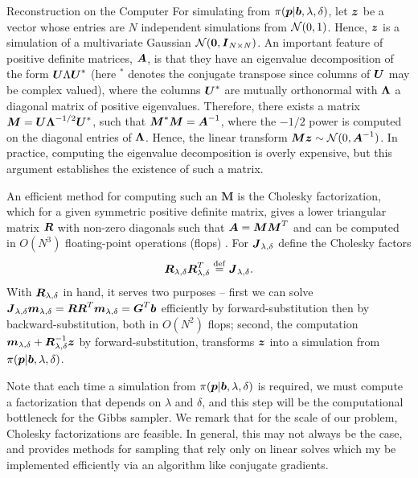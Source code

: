 \begin{chapter}{Reconstruction on the Computer}
For simulating from $\pi(\mbox{\boldmath$p$}|\mbox{\boldmath$b$}, \lambda,\delta)$, let $\mbox{\boldmath$z$}$ be a vector whose entries are $N$ independent simulations from $\mathcal{N}(0,1)$. 
Hence, $\mbox{\boldmath$z$}$ is a simulation of a multivariate Gaussian $\mathcal{N}(\mbox{\boldmath$0$},\mbox{\boldmath$I$}_{N\times N})$.
An important feature of positive definite matrices, $\mbox{\boldmath$A$}$, is that they have an eigenvalue decomposition of the form $\mbox{\boldmath$U$} \Lambda \mbox{\boldmath$U$}^*$ (here $^*$ denotes the conjugate transpose since columns of $\mbox{\boldmath$U$}$ may be complex valued), where the columns $\mbox{\boldmath$U$}^*$ are mutually orthonormal with $\mbox{\boldmath$\Lambda$}$ a diagonal matrix of positive eigenvalues.
Therefore, there exists a matrix $\mbox{\boldmath$M$} = \mbox{\boldmath$U$} \mbox{\boldmath$\Lambda$}^{-1/2} \mbox{\boldmath$U$}^*$, such that $\mbox{\boldmath$M$}^*\mbox{\boldmath$M$} = \mbox{\boldmath$A$}^{-1}$, where the $-1/2$ power is computed on the diagonal entries of $\mbox{\boldmath$\Lambda$}$.
Hence, the linear transform $\mbox{\boldmath$M$} \mbox{\boldmath$z$} \sim \mathcal{N}(0,\mbox{\boldmath$A$}^{-1})$.  
In practice, computing the eigenvalue decomposition is overly expensive, but this argument establishes the existence of such a matrix.

An efficient method for computing such an $\bm M$ is the Cholesky factorization, which for a given symmetric positive definite matrix, gives a lower triangular matrix $\mbox{\boldmath$R$}$ with non-zero diagonals such that $\mbox{\boldmath$A$} = \mbox{\boldmath$M$}\mbox{\boldmath$M$}^T$ and can be computed in $O(N^3)$ floating-point operations (flops) \citep{golub2012matrix}.
For $\mbox{\boldmath$J$}_{\lambda,\delta}$ define the Cholesky factors
\begin{equation} \label{eq:choleskyJ}
  \mbox{\boldmath$R$}_{\lambda,\delta}\mbox{\boldmath$R$}_{\lambda,\delta}^T \stackrel{\rm def}{=} \mbox{\boldmath$J$}_{\lambda,\delta}.
\end{equation}
With $\mbox{\boldmath$R$}_{\lambda,\delta}$ in hand, it serves two purposes -- first we can solve $\mbox{\boldmath$J$}_{\lambda,\delta} \mbox{\boldmath$m$}_{\lambda,\delta} = \mbox{\boldmath$R$}\mbox{\boldmath$R$}^T \mbox{\boldmath$m$}_{\lambda,\delta} = \mbox{\boldmath$G$}^T \mbox{\boldmath$b$}$ efficiently by forward-substitution then by backward-substitution, both in $O(N^2)$ flops; second, the computation $\mbox{\boldmath$m$}_{\lambda,\delta} + \mbox{\boldmath$R$}_{\lambda,\delta}^{-1} \mbox{\boldmath$z$}$ by forward-substitution, transforms $\mbox{\boldmath$z$}$ into a simulation from $\pi(\mbox{\boldmath$p$} | \mbox{\boldmath$b$},\lambda,\delta)$.

Note that each time a simulation from $\pi(\mbox{\boldmath$p$}|\mbox{\boldmath$b$},\lambda,\delta)$ is required, we must compute a factorization that depends on $\lambda$ and $\delta$, and this step will be the computational bottleneck for the Gibbs sampler.
We remark that for the scale of our problem, Cholesky factorizations are feasible.
In general, this may not always be the case, and \citep{bardsley2012mcmc} provides methods for sampling that rely only on linear solves which my be implemented efficiently via an algorithm like conjugate gradients.


\end{chapter}
